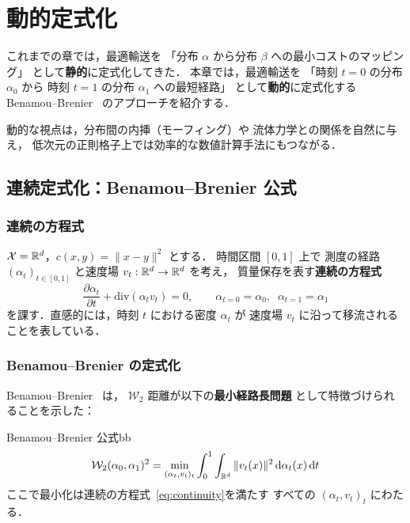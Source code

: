 
\chapter{動的定式化}\label{chap:dynamic}

これまでの章では，最適輸送を
「分布 $\alpha$ から分布 $\beta$ への最小コストのマッピング」
として\textbf{静的}に定式化してきた．
本章では，最適輸送を
「時刻 $t = 0$ の分布 $\alpha_0$ から
時刻 $t = 1$ の分布 $\alpha_1$ への最短経路」
として\textbf{動的}に定式化する
Benamou--Brenier~\cite{BenamouBrenier2000} のアプローチを紹介する．

動的な視点は，分布間の内挿（モーフィング）や
流体力学との関係を自然に与え，
低次元の正則格子上では効率的な数値計算手法にもつながる．


\section{連続定式化：Benamou--Brenier 公式}\label{sec:bb-formula}

\subsection{連続の方程式}\label{subsec:continuity-eq}

$\mathcal{X} = \mathbb{R}^d$，$c(x,y) = \|x - y\|^2$ とする．
時間区間 $[0, 1]$ 上で
測度の経路 $(\alpha_t)_{t \in [0,1]}$ と速度場 $v_t : \mathbb{R}^d \to \mathbb{R}^d$ を考え，
質量保存を表す\textbf{連続の方程式}
\begin{equation}\label{eq:continuity}
  \frac{\partial \alpha_t}{\partial t} + \mathrm{div}(\alpha_t v_t) = 0,
  \qquad \alpha_{t=0} = \alpha_0,\;\; \alpha_{t=1} = \alpha_1
\end{equation}
を課す．直感的には，時刻 $t$ における密度 $\alpha_t$ が
速度場 $v_t$ に沿って移流されることを表している．

\subsection{Benamou--Brenier の定式化}\label{subsec:bb-formulation}

Benamou--Brenier~\cite{BenamouBrenier2000} は，
$\mathcal{W}_2$ 距離が以下の\textbf{最小経路長問題}
として特徴づけられることを示した：

\begin{theorem}{Benamou--Brenier 公式}{bb}
\begin{equation}\label{eq:bb}
  \mathcal{W}_2(\alpha_0, \alpha_1)^2
  = \min_{(\alpha_t, v_t)_t}
  \int_0^1 \int_{\mathbb{R}^d} \|v_t(x)\|^2\, \mathrm{d}\alpha_t(x)\, \mathrm{d}t
\end{equation}
ここで最小化は連続の方程式~\eqref{eq:continuity}を満たす
すべての $(\alpha_t, v_t)_t$ にわたる．
\end{theorem}

